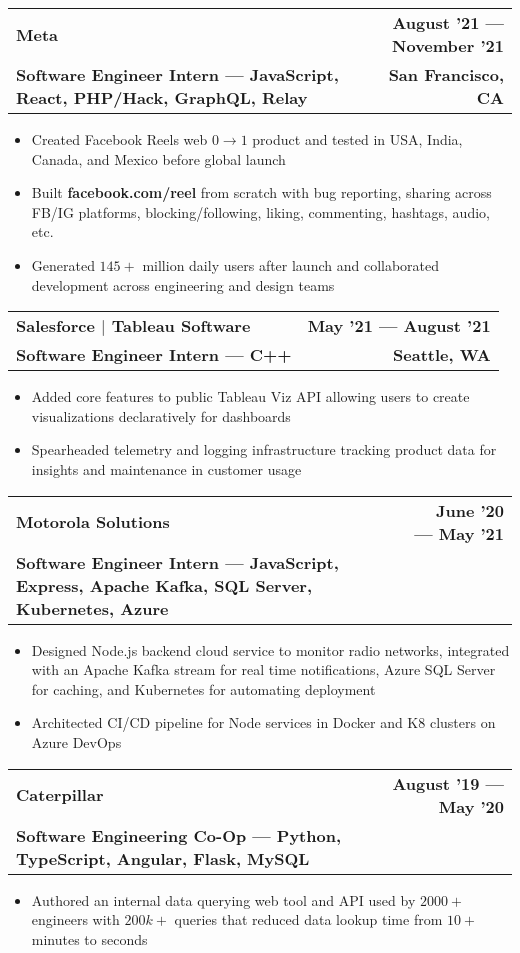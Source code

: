 \documentclass[letterpaper,11pt]{article}
\makeatletter
\newcommand{\resumeItem}[1]{
  \item\small{
    {#1 \vspace{-1pt}}
  }
}
\newcommand{\resumeSubheadingSmall}[4]{
  \vspace{-0pt}
  \item
    \begin{tabular*}{1\textwidth}[t]{l@{\extracolsep{\fill}}r}
      \textbf{#1} & \small{\color{main}\textbf{#2}} \\
      \color{secondary}\textbf{\footnotesize#3} & \color{secondary}\textbf{\footnotesize#4} \\
    \end{tabular*}\vspace{-7pt}
}
\newcommand{\resumeItemListStart}{\begin{itemize}}
\newcommand{\resumeItemListEnd}{\end{itemize}\vspace{0pt}}
\makeatother
\begin{document}
\resumeSubheadingSmall
{Meta} %
{August '21 --- November '21} %
{Software Engineer Intern --- JavaScript, React, PHP/Hack, GraphQL, Relay} %
{San Francisco, CA} %
\resumeItemListStart
\resumeItem{Created Facebook Reels web $0 \rightarrow 1$ product and tested in USA, India, Canada, and Mexico before global launch}
\resumeItem{Built \textbf{facebook.com/reel} from scratch with bug reporting, sharing across FB/IG platforms, blocking/following, liking, commenting, hashtags, audio, etc.}
\resumeItem{Generated $145+$ million daily users after launch and collaborated development across engineering and design teams}
\resumeItemListEnd

\resumeSubheadingSmall
{Salesforce $|$ Tableau Software} %
{May '21 --- August '21} %
{Software Engineer Intern --- C++} %
{Seattle, WA} %
\resumeItemListStart
\resumeItem{Added core features to public Tableau Viz API allowing users to create visualizations declaratively for dashboards}
\resumeItem{Spearheaded telemetry and logging infrastructure tracking product data for insights and maintenance in customer usage}
\resumeItemListEnd

\resumeSubheadingSmall
{Motorola Solutions} %
{June '20 --- May '21} %
{Software Engineer Intern --- JavaScript, Express, Apache Kafka, SQL Server, Kubernetes, Azure} %
{} %
\resumeItemListStart
\resumeItem{Designed Node.js backend cloud service to monitor radio networks, integrated with an Apache Kafka stream for real time notifications, Azure SQL Server for caching, and Kubernetes for automating deployment}
\resumeItem{Architected CI/CD pipeline for Node services in Docker and K8 clusters on Azure DevOps}
\resumeItemListEnd

\resumeSubheadingSmall
{Caterpillar} %
{August '19 --- May '20} %
{Software Engineering Co-Op --- Python, TypeScript, Angular, Flask, MySQL} %
{} %
\resumeItemListStart
\resumeItem{Authored an internal data querying web tool and API used by $2000+$ engineers with $200k+$ queries that reduced data lookup time from $10+$ minutes to seconds}
\resumeItemListEnd

\end{document}
